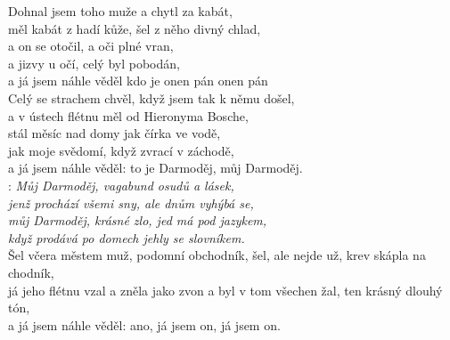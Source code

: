 \begin{large}

Dohnal jsem toho muže a chytl za kabát,\\
měl kabát z hadí kůže, šel z něho divný chlad,\\
a on se otočil, a oči plné vran,\\
a jizvy u očí, celý byl pobodán,\\
a já jsem náhle věděl kdo je onen pán onen pán\\

Celý se strachem chvěl, když jsem tak k němu došel,\\
a v ústech flétnu měl od Hieronyma Bosche,\\
stál měsíc nad domy jak čírka ve vodě,\\
jak moje svědomí, když zvrací v záchodě,\\
a já jsem náhle věděl: to je Darmoděj, můj Darmoděj.\\

\textregistered: \emph{Můj Darmoděj, vagabund osudů a lásek,\\
jenž prochází všemi sny, ale dnům vyhýbá se,\\
můj Darmoděj, krásné zlo, jed má pod jazykem,\\
když prodává po domech jehly se slovníkem.}\\

Šel včera městem muž, podomní obchodník,
šel, ale nejde už, krev skápla na chodník,\\
já jeho flétnu vzal a zněla jako zvon
a byl v tom všechen žal, ten krásný dlouhý tón,\\
a já jsem náhle věděl: ano, já jsem on, já jsem on. \hspace{1cm}
\textregistered

\end{large}

\newpage
